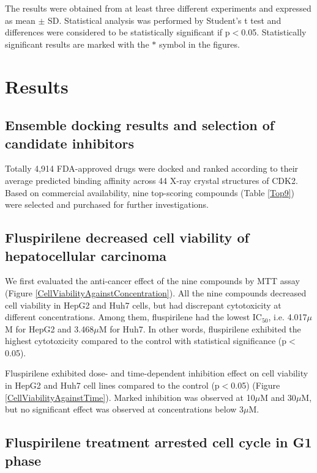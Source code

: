 \documentclass[10pt]{article}
\begin{document}
The results were obtained from at least three different experiments and expressed as mean $\pm$ SD. Statistical analysis was performed by Student's t test and differences were considered to be statistically significant if p$<$0.05. Statistically significant results are marked with the $\ast$ symbol in the figures.

\section*{Results}

\subsection*{Ensemble docking results and selection of candidate inhibitors}

Totally 4,914 FDA-approved drugs were docked and ranked according to their average predicted binding affinity across 44 X-ray crystal structures of CDK2. Based on commercial availability, nine top-scoring compounds (Table \ref{Top9}) were selected and purchased for further investigations.

\subsection*{Fluspirilene decreased cell viability of hepatocellular carcinoma}

We first evaluated the anti-cancer effect of the nine compounds by MTT assay (Figure \ref{CellViabilityAgainstConcentration}). All the nine compounds decreased cell viability in HepG2 and Huh7 cells, but had discrepant cytotoxicity at different concentrations. Among them, fluspirilene had the lowest IC$_{50}$, i.e. 4.017$\mu$M for HepG2 and 3.468$\mu$M for Huh7. In other words, fluspirilene exhibited the highest cytotoxicity compared to the control with statistical significance (p$<$0.05).

Fluspirilene exhibited dose- and time-dependent inhibition effect on cell viability in HepG2 and Huh7 cell lines compared to the control (p$<$0.05) (Figure \ref{CellViabilityAgainstTime}). Marked inhibition was observed at 10$\mu$M and 30$\mu$M, but no significant effect was observed at concentrations below 3$\mu$M.

\subsection*{Fluspirilene treatment arrested cell cycle in G1 phase}
\end{document}
